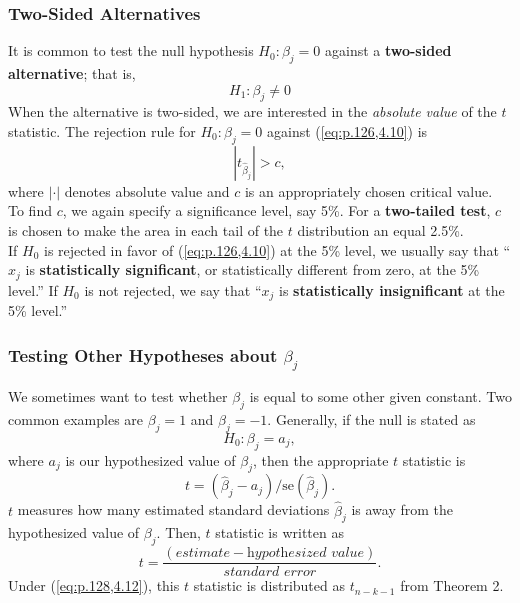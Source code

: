 \documentclass[a4paper, 10pt]{article}
\theoremstyle{definition}	%
\begin{document}
\subsubsection{Two-Sided Alternatives}
It is common to test the null hypothesis $H_0:\beta_j = 0$ against a \textbf{two-sided alternative}; that is, 
\begin{equation}
    H_1 : \beta_j \neq 0 \label{eq:p.126,4.10}
\end{equation}
When the alternative is two-sided, we are interested in the \textit{absolute value} of the $t$ statistic. The rejection rule for $H_0: \beta_j = 0$ against (\ref{eq:p.126,4.10}) is
\begin{equation}
    |t_{\hat{\beta}_j}| > c,
\end{equation}
where $|\cdot|$ denotes absolute value and $c$ is an appropriately chosen critical value. To find $c$, we again specify a significance level, say 5\%. For a \textbf{two-tailed test}, $c$ is chosen to make the area in each tail of the $t$ distribution an equal 2.5\%.\\
If $H_0$ is rejected in favor of (\ref{eq:p.126,4.10}) at the 5\% level, we usually say that “$x_j$ is \textbf{statistically significant}, or statistically different from zero, at the 5\% level.” If $H_0$ is not rejected, we say that “$x_j$ is \textbf{statistically insignificant} at the 5\% level.”
\subsubsection{Testing Other Hypotheses about \texorpdfstring{$\beta_j$}{beta j}}
We sometimes want to test whether $\beta_j$ is equal to some other given constant. Two common examples are $\beta_j = 1$ and $\beta_j = -1$. Generally, if the null is stated as
\begin{equation}
    H_0: \beta_j = a_j, \label{eq:p.128,4.12}
\end{equation}
where $a_j$ is our hypothesized value of $\beta_j$, then the appropriate $t$ statistic is
\begin{equation*}
    t = (\hat{\beta}_j - a_j)/\text{se}(\hat{\beta}_j).
\end{equation*}
$t$ measures how many estimated standard deviations $\hat{\beta}_j$ is away from the hypothesized value of $\beta_j$. Then, $t$ statistic is written as
\begin{equation}
    t = \frac{(\textit{estimate} - \textit{hypothesized value})}{\textit{standard error}}. \label{eq:p.128,4.13}
\end{equation}
Under (\ref{eq:p.128,4.12}), this $t$ statistic is distributed as $t_{n-k-1}$ from Theorem 2.
\end{document}
